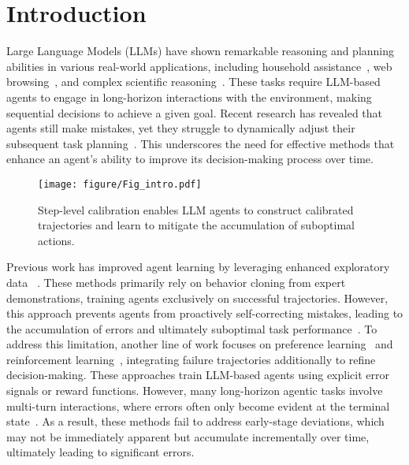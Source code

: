 \section{Introduction}

Large Language Models (LLMs) have shown remarkable reasoning and planning abilities in various real-world applications, including household assistance~\citep{puig2018virtualhome,shridhar2020alfworld}, web browsing~\citep{yao2022webshop,deng2023mind2web}, and complex scientific reasoning~\citep{wang-etal-2022-scienceworld}. These tasks require LLM-based agents to engage in long-horizon interactions with the environment, making sequential decisions to achieve a given goal. 
Recent research has revealed that agents still make mistakes, yet they struggle to dynamically adjust their subsequent task planning~\citep{xie2024revealing,wang-etal-2024-e2cl}. This underscores the need for effective methods that enhance an agent's ability to improve its decision-making process over time.


\begin{figure}[t!]
    \centering
    \texttt{[image: figure/Fig\_intro.pdf]}
    \caption{Step-level calibration enables LLM agents to construct calibrated trajectories and learn to mitigate the accumulation of suboptimal actions.}
    \label{fig:intro}
    \vspace{-9pt}
\end{figure} 


Previous work has improved agent learning by leveraging enhanced exploratory data ~\citep{chen2023fireact,yin2023lumos,zeng2023agenttuning,xiang2024language}. These methods primarily rely on behavior cloning from expert demonstrations, training agents exclusively on successful trajectories. However, this approach prevents agents from proactively self-correcting mistakes, leading to the accumulation of errors and ultimately suboptimal task performance~\citep{xie2024revealing}.
To address this limitation, another line of work focuses on preference learning~\citep{song2024trial, xiong2024watch} and reinforcement learning~\citep{carta2023grounding,tan2024true}, integrating failure trajectories additionally to refine decision-making. These approaches train LLM-based agents using explicit error signals or reward functions. 
However, many long-horizon agentic tasks involve multi-turn interactions, where errors often only become evident at the terminal state~\citep{yuan2025agent}. As a result, these methods fail to address early-stage deviations, which may not be immediately apparent but accumulate incrementally over time, ultimately leading to significant errors.



